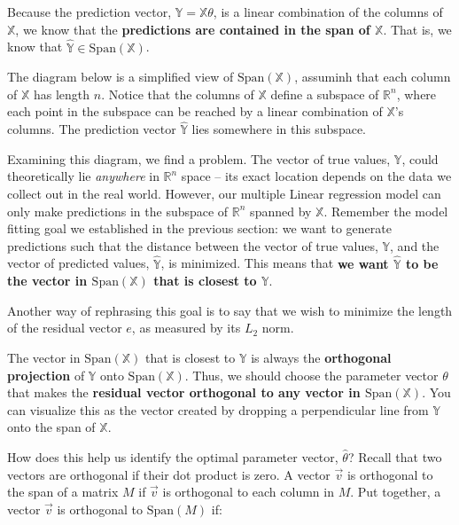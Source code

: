 \documentclass[
  letterpaper,
  DIV=11,
  numbers=noendperiod]{scrreprt}
\begin{document}
Because the prediction vector, \(\hat{\mathbb{Y}} = \mathbb{X} \theta\),
is a linear combination of the columns of \(\mathbb{X}\), we know that
the \textbf{predictions are contained in the span of \(\mathbb{X}\)}.
That is, we know that \(\mathbb{\hat{Y}} \in \text{Span}(\mathbb{X})\).

The diagram below is a simplified view of \(\text{Span}(\mathbb{X})\),
assuminh that each column of \(\mathbb{X}\) has length \(n\). Notice
that the columns of \(\mathbb{X}\) define a subspace of
\(\mathbb{R}^n\), where each point in the subspace can be reached by a
linear combination of \(\mathbb{X}\)'s columns. The prediction vector
\(\mathbb{\hat{Y}}\) lies somewhere in this subspace.

Examining this diagram, we find a problem. The vector of true values,
\(\mathbb{Y}\), could theoretically lie \emph{anywhere} in
\(\mathbb{R}^n\) space -- its exact location depends on the data we
collect out in the real world. However, our multiple Linear regression
model can only make predictions in the subspace of \(\mathbb{R}^n\)
spanned by \(\mathbb{X}\). Remember the model fitting goal we
established in the previous section: we want to generate predictions
such that the distance between the vector of true values,
\(\mathbb{Y}\), and the vector of predicted values,
\(\mathbb{\hat{Y}}\), is minimized. This means that \textbf{we want
\(\mathbb{\hat{Y}}\) to be the vector in \(\text{Span}(\mathbb{X})\)
that is closest to \(\mathbb{Y}\)}.

Another way of rephrasing this goal is to say that we wish to minimize
the length of the residual vector \(e\), as measured by its \(L_2\)
norm.

The vector in \(\text{Span}(\mathbb{X})\) that is closest to
\(\mathbb{Y}\) is always the \textbf{orthogonal projection} of
\(\mathbb{Y}\) onto \(\text{Span}(\mathbb{X})\). Thus, we should choose
the parameter vector \(\theta\) that makes the \textbf{residual vector
orthogonal to any vector in \(\text{Span}(\mathbb{X})\)}. You can
visualize this as the vector created by dropping a perpendicular line
from \(\mathbb{Y}\) onto the span of \(\mathbb{X}\).

How does this help us identify the optimal parameter vector,
\(\hat{\theta}\)? Recall that two vectors are orthogonal if their dot
product is zero. A vector \(\vec{v}\) is orthogonal to the span of a
matrix \(M\) if \(\vec{v}\) is orthogonal to each column in \(M\). Put
together, a vector \(\vec{v}\) is orthogonal to \(\text{Span}(M)\) if:
\end{document}
